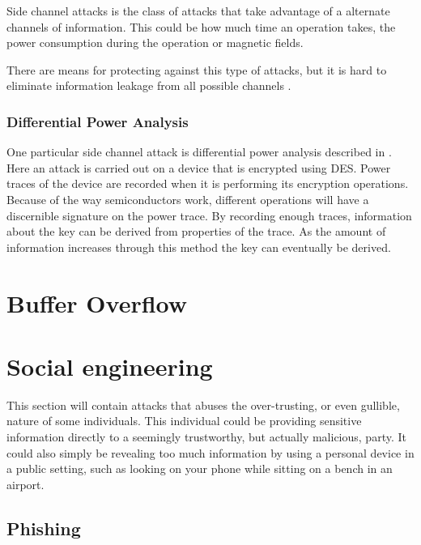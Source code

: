 Side channel attacks is the class of attacks that take advantage of a alternate channels of information.
This could be how much time an operation takes, the power consumption during the operation or magnetic fields.

There are means for protecting against this type of attacks, but it is hard to eliminate information leakage from all possible channels \citep[p.~132]{cryptoenginering}.

\subsubsection{Differential Power Analysis}\label{attack:dpa}
One particular side channel attack is differential power analysis described in \citet{DPA}.
Here an attack is carried out on a device that is encrypted using DES.
Power traces of the device are recorded when it is performing its encryption operations.
Because of the way semiconductors work, different operations will have a discernible signature on the power trace.
By recording enough traces, information about the key can be derived from properties of the trace.
As the amount of information increases through this method the key can eventually be derived.

\section{Buffer Overflow}\label{attack:bufferoverflow}


\section{Social engineering}
This section will contain attacks that abuses the over-trusting, or even gullible, nature of some individuals.
This individual could be providing sensitive information directly to a seemingly trustworthy, but actually malicious, party.
It could also simply be revealing too much information by using a personal device in a public setting, such as looking on your phone while sitting on a bench in an airport.

\subsection{Phishing}\label{attack:phishing}

